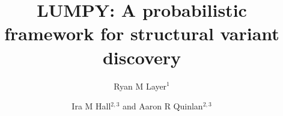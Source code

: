 \documentclass[10pt]{bmc_article}
\newenvironment{bmcformat}{\begin{raggedright}\baselineskip20pt\sloppy\setboolean{publ}{false}}{\end{raggedright}\baselineskip20pt\sloppy}
\begin{document}
\begin{bmcformat}

\title{LUMPY: A probabilistic framework for structural variant discovery}
\author{
Ryan M Layer$^1$\and
Ira M Hall\correspondingauthor$^{2,3}$
and
Aaron R Quinlan\correspondingauthor$^{2,3}$
}

\address{\iid(1)Department of Computer Science, University of Virginia,
Charlottesville, VA\\
\iid(2)Department of Biochemistry and Molecular Genetics,
University of Virginia, Charlottesville, VA\\
\iid(3)Department of Public Health Sciences and
Center for Public Health Genomics, University of Virginia, Charlottesville, VA
}



\end{bmcformat}
\end{document}
